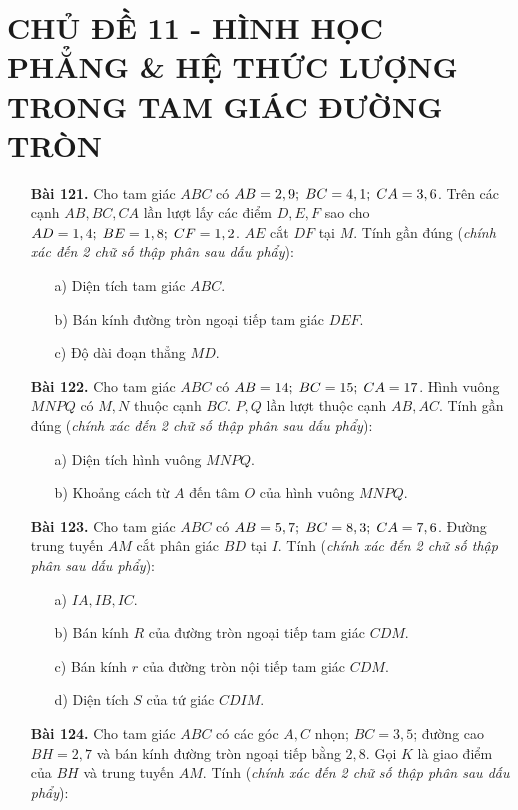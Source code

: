 \documentclass[12pt,a4paper]{article}
\begin{document}
\section*{CHỦ ĐỀ 11 - HÌNH HỌC PHẲNG \& HỆ THỨC LƯỢNG TRONG TAM GIÁC ĐƯỜNG TRÒN}
\begin{enumerate}
    \item[\textbf{Bài 121.}] Cho tam giác $ABC$ có $AB = 2,9;\thickspace BC = 4,1;\thickspace CA = 3,6$. Trên các cạnh $AB,BC,CA$ lần lượt lấy các điểm $D,E,F$ sao cho $AD = 1,4;\thickspace BE = 1,8;\thickspace CF = 1,2$. $AE$ cắt $DF$ tại $M$. Tính gần đúng (\textit{chính xác đến 2 chữ số thập phân sau dấu phẩy}): 
        \begin{enumerate}
            \item[a)] Diện tích tam giác $ABC$.
            \item[b)] Bán kính đường tròn ngoại tiếp tam giác $DEF$.
            \item[c)] Độ dài đoạn thẳng $MD$.
        \end{enumerate}
    \item[\textbf{Bài 122.}] Cho tam giác $ABC$ có $AB = 14;\thickspace BC = 15;\thickspace CA = 17$. Hình vuông $MNPQ$ có $M,N$ thuộc cạnh $BC$. $P,Q$ lần lượt thuộc cạnh $AB,AC$. Tính gần đúng (\textit{chính xác đến 2 chữ số thập phân sau dấu phẩy}):
        \begin{enumerate}
            \item[a)] Diện tích hình vuông $MNPQ$.
            \item[b)] Khoảng cách từ $A$ đến tâm $O$ của hình vuông $MNPQ$.
        \end{enumerate}
    \item[\textbf{Bài 123.}] Cho tam giác $ABC$ có $AB = 5,7;\thickspace BC = 8,3;\thickspace CA = 7,6$. Đường trung tuyến $AM$ cắt phân giác $BD$ tại $I$. Tính (\textit{chính xác đến 2 chữ số thập phân sau dấu phẩy}):
        \begin{enumerate}
            \item[a)] $IA,IB,IC$.
            \item[b)] Bán kính $R$ của đường tròn ngoại tiếp tam giác $CDM$.
            \item[c)] Bán kính $r$ của đường tròn nội tiếp tam giác $CDM$.
            \item[d)] Diện tích $S$ của tứ giác $CDIM$.
        \end{enumerate}
    \item[\textbf{Bài 124.}] Cho tam giác $ABC$ có các góc $A,C$ nhọn; $BC = 3,5$; đường cao $BH = 2,7$ và bán kính đường tròn ngoại tiếp bằng $2,8$. Gọi $K$ là giao điểm của $BH$ và trung tuyến $AM$. Tính (\textit{chính xác đến 2 chữ số thập phân sau dấu phẩy}):

\end{enumerate}
\end{document}
